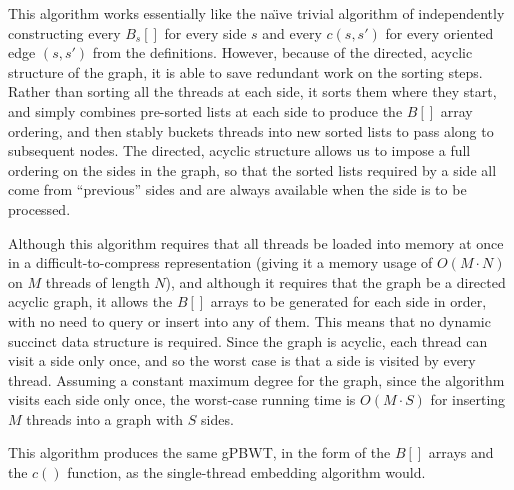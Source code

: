 This algorithm works essentially like the na\"{\i}ve trivial algorithm of independently constructing every $B_s[]$ for every side $s$ and every $c(s, s')$ for every oriented edge $(s, s')$ from the definitions. However, because of the directed, acyclic structure of the graph, it is able to save redundant work on the sorting steps. Rather than sorting all the threads at each side, it sorts them where they start, and simply combines pre-sorted lists at each side to produce the $B[]$ array ordering, and then stably buckets threads into new sorted lists to pass along to subsequent nodes. The directed, acyclic structure allows us to impose a full ordering on the sides in the graph, so that the sorted lists required by a side all come from ``previous'' sides and are always available when the side is to be processed. 

Although this algorithm requires that all threads be loaded into memory at once in a difficult-to-compress representation (giving it a memory usage of $O(M \cdot N)$ on $M$ threads of length $N$), and although it requires that the graph be a directed acyclic graph, it allows the $B[]$ arrays to be generated for each side in order, with no need to query or insert into any of them. This means that no dynamic succinct data structure is required. Since the graph is acyclic, each thread can visit a side only once, and so the worst case is that a side is visited by every thread. Assuming a constant maximum degree for the graph, since the algorithm visits each side only once, the worst-case running time is $O(M \cdot S)$ for inserting $M$ threads into a graph with $S$ sides.

This algorithm produces the same gPBWT, in the form of the $B[]$ arrays and the $c()$ function, as the single-thread embedding algorithm would.

